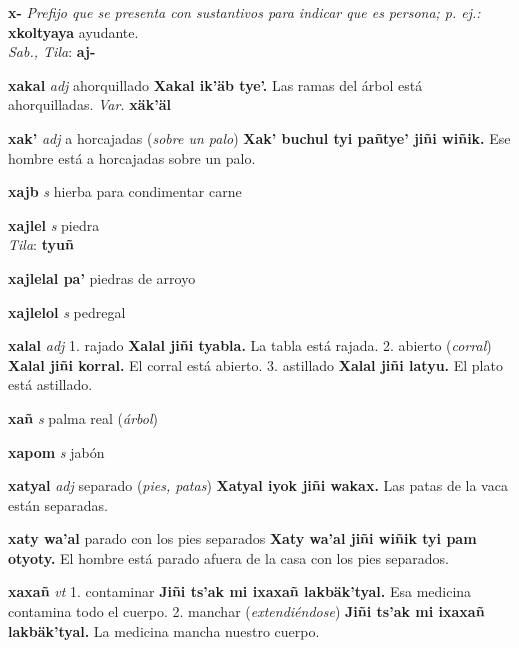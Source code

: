 \documentclass[10pt]{scrbook}
\newcommand{\entry}[1]{\textbf{#1}}
\newcommand{\alphaletter}[1]{\end{multicols}\addsec{#1}\begin{multicols}{2}}
\newcommand{\onedefinition}[1]{#1.}
\newcommand{\nontranslationdef}[1]{\textit{#1}}
\newcommand{\partofspeech}[1]{\textit{#1}}
\newcommand{\spanishtranslation}[1]{#1}
\newcommand{\clarification}[1]{(\textit{#1})}
\newcommand{\cholexample}[1]{\textbf{#1}}
\newcommand{\exampletranslation}[1]{#1}
\newcommand{\dialectvariant}[1]{\\\textit{#1}:}
\newcommand{\dialectword}[1]{\textbf{#1}}
\newcommand{\variation}[1]{\textit{Var.} \textbf{#1}}
\begin{document}
\begin{multicols}{2}
\alphaletter{X}

\entry{x-}
\nontranslationdef{Prefijo que se presenta con sustantivos para indicar que es persona; p. ej.:}
\cholexample{xkoltyaya}
\exampletranslation{ayudante.}
\dialectvariant{Sab., Tila}
\dialectword{aj-}

\entry{xakal}
\partofspeech{adj}
\spanishtranslation{ahorquillado}
\cholexample{Xakal ik'äb tye'.}
\exampletranslation{Las ramas del árbol está ahorquilladas.}
\variation{xäk'äl}

\entry{xak'}
\partofspeech{adj}
\spanishtranslation{a horcajadas}
\clarification{sobre un palo}
\cholexample{Xak' buchul tyi pañtye' jiñi wiñik.}
\exampletranslation{Ese hombre está a horcajadas sobre un palo.}

\entry{xajb}
\partofspeech{s}
\spanishtranslation{hierba para condimentar carne}

\entry{xajlel}
\partofspeech{s}
\spanishtranslation{piedra}
\dialectvariant{Tila}
\dialectword{tyuñ}

\entry{xajlelal pa'}
\spanishtranslation{piedras de arroyo}

\entry{xajlelol}
\partofspeech{s}
\spanishtranslation{pedregal}

\entry{xalal}
\partofspeech{adj}
\onedefinition{1}
\spanishtranslation{rajado}
\cholexample{Xalal jiñi tyabla.}
\exampletranslation{La tabla está rajada.}
\onedefinition{2}
\spanishtranslation{abierto}
\clarification{corral}
\cholexample{Xalal jiñi korral.}
\exampletranslation{El corral está abierto.}
\onedefinition{3}
\spanishtranslation{astillado}
\cholexample{Xalal jiñi latyu.}
\exampletranslation{El plato está astillado.}

\entry{xañ}
\partofspeech{s}
\spanishtranslation{palma real}
\clarification{árbol}

\entry{xapom}
\partofspeech{s}
\spanishtranslation{jabón}

\entry{xatyal}
\partofspeech{adj}
\spanishtranslation{separado}
\clarification{pies, patas}
\cholexample{Xatyal iyok jiñi wakax.}
\exampletranslation{Las patas de la vaca están separadas.}

\entry{xaty wa'al}
\spanishtranslation{parado con los pies separados}
\cholexample{Xaty wa'al jiñi wiñik tyi pam otyoty.}
\exampletranslation{El hombre está parado afuera de la casa con los pies separados.}

\entry{xaxañ}
\partofspeech{vt}
\onedefinition{1}
\spanishtranslation{contaminar}
\cholexample{Jiñi ts'ak mi ixaxañ lakbäk'tyal.}
\exampletranslation{Esa medicina contamina todo el cuerpo.}
\onedefinition{2}
\spanishtranslation{manchar}
\clarification{extendiéndose}
\cholexample{Jiñi ts'ak mi ixaxañ lakbäk'tyal.}
\exampletranslation{La medicina mancha nuestro cuerpo.}


\end{multicols}
\end{document}
